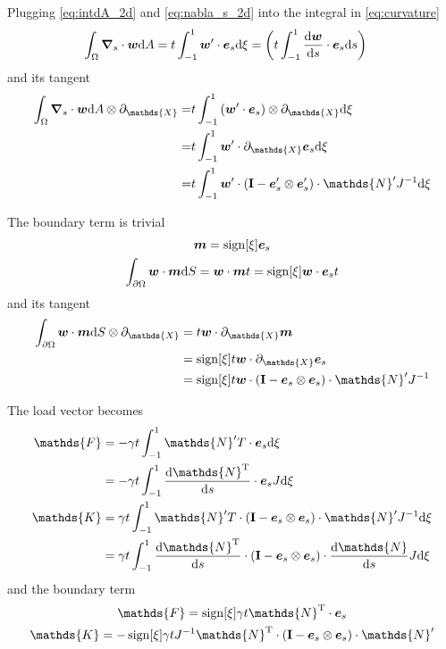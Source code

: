 \documentclass[a4paper,11pt]{article}
\renewcommand{\to}[1]{\text{\boldmath $#1$}} %
\newcommand{\ts}[1]{\text{\boldmath $\mathrm{#1}$}} %
\newcommand{\uv}[1]{\mathds{#1}}
\newcommand{\um}[1]{\mathds{#1}}
\newcommand{\intd}[1]{\mathrm{d}#1}
\newcommand{\pderiv}[2]{\partial_{#2} #1}
\newcommand{\dderiv}[2]{\frac{\mathrm{d}#1}{\mathrm{d}#2}}
\newcommand{\T}{\mathrm{T}}
\DeclareMathOperator{\sign}{sign}
\begin{document}
Plugging \eqref{eq:intdA_2d} and \eqref{eq:nabla_s_2d} into the integral in \eqref{eq:curvature}
\begin{align}
 \int_\Omega\to \nabla_s\cdot\to w\intd A &= t \int_{-1}^{1} \to w'\cdot \to e_s \intd\xi = \left( t \int_{-1}^1 \dderiv{\to w}{s} \cdot \to e_s\intd s\right)
\end{align}
and its tangent
\begin{align}
 \int_\Omega\to \nabla_s\cdot\to w\intd A \otimes \pderiv{}{\uv X}
 =&t \int_{-1}^{1} \left(\to w'\cdot \to e_s\right)\otimes \pderiv{}{\uv X}  \intd\xi\\
 =&t \int_{-1}^{1} \to w'\cdot \pderiv{\to e_s}{\uv X} \intd\xi\\
 =&t \int_{-1}^{1} \to w'\cdot \left(\ts I-\to e_s'\otimes\to e_s' \right)\cdot \um N' J^{-1} \intd\xi
\end{align}

The boundary term is trivial
\begin{gather}
 \to m = \sign[\xi]\to e_s\\
 \int_{\partial\Omega} \to w\cdot \to m\intd S = \to w \cdot\to m t = \sign[\xi]\to w \cdot \to e_s t
\end{gather}
and its tangent
\begin{align}
 \int_{\partial\Omega} \to w\cdot \to m\intd S\otimes \pderiv{}{\uv X} &= t \to w\cdot\pderiv{\to m}{\uv X}\\
 &= \sign[\xi]t \to w\cdot\pderiv{\to e_s}{\uv X}\\
 &= \sign[\xi]t \to w\cdot \left(\ts I-\to e_s\otimes\to e_s\right)\cdot \um N' J^{-1}
\end{align}

The load vector becomes
\begin{align}
 \uv F &= -\gamma t \int_{-1}^{1} {\um N}'^\T\cdot \to e_s \intd\xi\\
       &= -\gamma t \int_{-1}^{1} \dderiv{{\um N}^\T}{s}\cdot \to e_s J \intd\xi \\
 \um K &= \gamma t \int_{-1}^{1} {\um N}'^\T\cdot \left(\ts I-\to e_s\otimes\to e_s\right)\cdot{\um N}' J^{-1} \intd\xi\\
       &=  \gamma t \int_{-1}^{1} \dderiv{\um N^\T}{s}\cdot \left(\ts I-\to e_s\otimes\to e_s\right)\cdot\dderiv{\um N}{s} J \intd\xi
\end{align}
and the boundary term
\begin{gather}
 \uv F = \sign[\xi]\gamma t {\um N}^\T\cdot\to e_s\\
 \um K = -\sign[\xi]\gamma t J^{-1} {\um N}^\T \cdot (\ts I - \to e_s\otimes \to e_s)\cdot {\um N}'
\end{gather}
\end{document}
